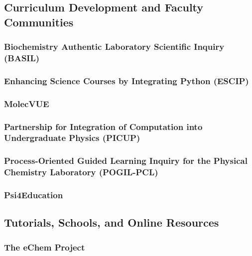 \documentclass[9pt,review]{livecoms}
\begin{document}
\subsection{Curriculum Development and Faculty Communities}

\subsubsection{Biochemistry Authentic Laboratory Scientific Inquiry (BASIL)}


\subsubsection{Enhancing Science Courses by Integrating Python (ESCIP)}


\subsubsection{MolecVUE}


\subsubsection{Partnership for Integration of Computation into Undergraduate Physics (PICUP)}


\subsubsection{Process-Oriented Guided Learning Inquiry for the Physical Chemistry Laboratory (POGIL-PCL)}


\subsubsection{Psi4Education}


\subsection{Tutorials, Schools, and Online Resources}

\subsubsection{The eChem Project}
\end{document}
